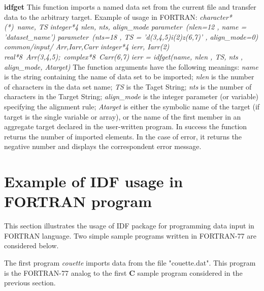 {
{\bf idfget}\hfil\break
This function imports a named data set from the current file 
and transfer data to the arbitrary target.
Example of usage in FORTRAN:\hfil\break
{\it character*(*)\ name, TS}\hfil\break
{\it integer*4 nlen, nts, align\_mode}\hfil\break
{\it parameter\ (nlen=12 , name = 'dataset\_name')}\hfil\break
{\it parameter\ (nts=18 , TS = 'd(3,4,5)i(2)z(6,7)' , align\_mode=0)}\hfil\break
{\it common/input/ Arr,Iarr,Carr}\hfil\break
{\it integer*4 ierr, Iarr(2)}\hfil\break
{\it real*8\ Arr(3,4,5);\ complex*8\ Carr(6,7)}\hfil\break
{\it ierr = idfget(name, nlen , TS, nts , align\_mode, Atarget)}\hfil\break
The function arguments have the following meanings:
{\it name} is the string containing the name of data set to be imported;
{\it nlen} is the number of characters in the data set name;
{\it TS} is the Taget String;
{\it nts} is the number of characters in the Target String;
{\it align\_mode} is the integer parameter (or variable)
specifying the alignment rule;
{\it Atarget} is either the symbolic name of the target
(if target is the single variable or array),
or the name of the first member in an aggregate target 
declared in the user-written program.
In success the function returns the number of imported elements.
In the case of error, it returns the negative number
and displays the correspondent error message.
}

\section*{Example of IDF usage in FORTRAN program}

This section illustrates the usage of IDF package
for programming data input in FORTRAN language.
Two simple sample programs written in FORTRAN-77
are considered below.

The first program {\it couette} imports data
from the file "couette.dat". This program is the FORTRAN-77 analog
to the first {\bf C} sample program considered in the previous
section.


